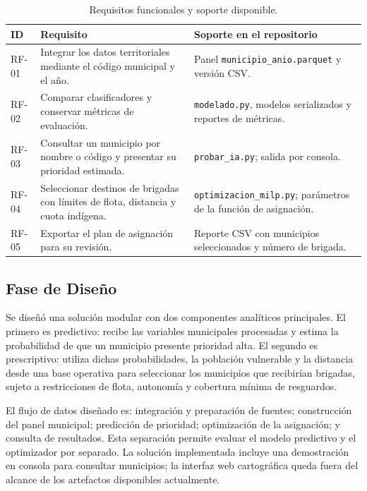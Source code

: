 \documentclass[12pt]{article}
\begin{document}
\begin{table}[H]
\centering
\small
\caption{Requisitos funcionales y soporte disponible.}
\label{tab:requisitos}
\begin{tabular}{@{}>{\raggedright\arraybackslash}p{1cm}
                    >{\raggedright\arraybackslash}p{7.5cm}
                    >{\raggedright\arraybackslash}p{6.7cm}@{}}
\toprule
\textbf{ID} & \textbf{Requisito} & \textbf{Soporte en el repositorio} \\
\midrule
RF-01 & Integrar los datos territoriales mediante el código municipal y el año. & Panel \texttt{municipio\_anio.parquet} y versión CSV. \\
RF-02 & Comparar clasificadores y conservar métricas de evaluación. & \texttt{modelado.py}, modelos serializados y reportes de métricas. \\
RF-03 & Consultar un municipio por nombre o código y presentar su prioridad estimada. & \texttt{probar\_ia.py}; salida por consola. \\
RF-04 & Seleccionar destinos de brigadas con límites de flota, distancia y cuota indígena. & \texttt{optimizacion\_milp.py}; parámetros de la función de asignación. \\
RF-05 & Exportar el plan de asignación para su revisión. & Reporte CSV con municipios seleccionados y número de brigada. \\
\bottomrule
\end{tabular}
\end{table}

\subsection{Fase de Diseño}
Se diseñó una solución modular con dos componentes analíticos principales. El primero es predictivo: recibe las variables municipales procesadas y estima la probabilidad de que un municipio presente prioridad alta. El segundo es prescriptivo: utiliza dichas probabilidades, la población vulnerable y la distancia desde una base operativa para seleccionar los municipios que recibirían brigadas, sujeto a restricciones de flota, autonomía y cobertura mínima de resguardos.

El flujo de datos diseñado es: integración y preparación de fuentes; construcción del panel municipal; predicción de prioridad; optimización de la asignación; y consulta de resultados. Esta separación permite evaluar el modelo predictivo y el optimizador por separado. La solución implementada incluye una demostración en consola para consultar municipios; la interfaz web cartográfica queda fuera del alcance de los artefactos disponibles actualmente.
\end{document}
